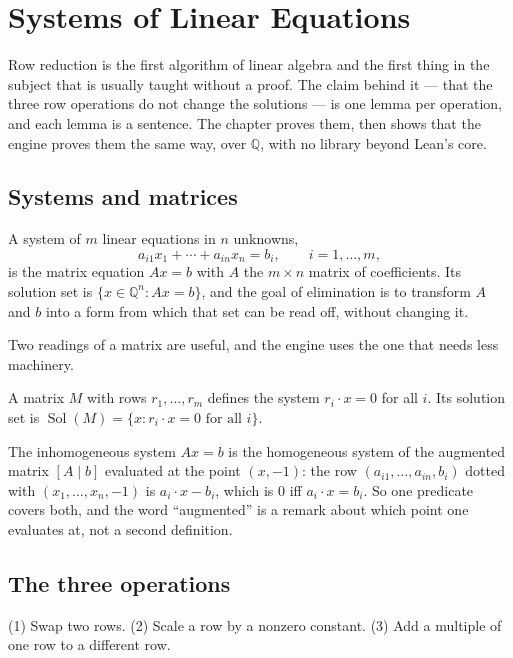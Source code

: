 \chapter{Systems of Linear Equations}\label{ch:systems}

Row reduction is the first algorithm of linear algebra and the first thing in the subject that
is usually taught without a proof. The claim behind it --- that the three row operations do not
change the solutions --- is one lemma per operation, and each lemma is a sentence. The chapter
proves them, then shows that the engine proves them the same way, over $\mathbb{Q}$, with no
library beyond Lean's core.

\section{Systems and matrices}

A system of $m$ linear equations in $n$ unknowns,
\[
  a_{i1} x_1 + \cdots + a_{in} x_n = b_i, \qquad i = 1, \ldots, m,
\]
is the matrix equation $Ax = b$ with $A$ the $m \times n$ matrix of coefficients. Its solution set
is $\{x \in \mathbb{Q}^n : Ax = b\}$, and the goal of elimination is to transform $A$ and $b$ into
a form from which that set can be read off, without changing it.

Two readings of a matrix are useful, and the engine uses the one that needs less machinery.

\begin{definition}
  A matrix $M$ with rows $r_1, \ldots, r_m$ defines the system $r_i \cdot x = 0$ for all $i$. Its
  solution set is $\operatorname{Sol}(M) = \{x : r_i \cdot x = 0 \text{ for all } i\}$.
\end{definition}

The inhomogeneous system $Ax = b$ is the homogeneous system of the augmented matrix
$[A \mid b]$ evaluated at the point $(x, -1)$: the row $(a_{i1}, \ldots, a_{in}, b_i)$ dotted with
$(x_1, \ldots, x_n, -1)$ is $a_i \cdot x - b_i$, which is $0$ iff $a_i \cdot x = b_i$. So one
predicate covers both, and the word ``augmented'' is a remark about which point one evaluates
at, not a second definition.

\section{The three operations}

\begin{definition}
  (1) Swap two rows. (2) Scale a row by a nonzero constant. (3) Add a multiple of one row to a
  different row.
\end{definition}

